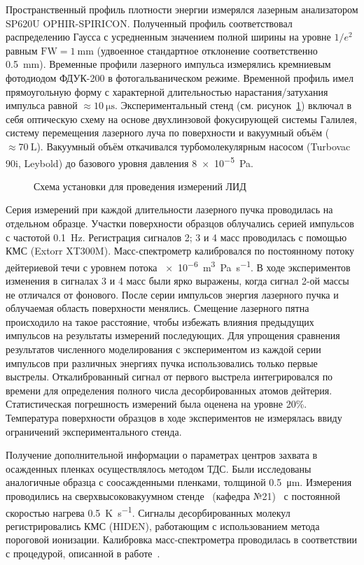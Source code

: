 Пространственный профиль плотности энергии измерялся лазерным анализатором SP620U OPHIR-SPIRICON. Полученный профиль соответствовал распределению Гаусса с усредненным значением полной ширины на уровне $1/e^2$ равным \(\mathrm{FW}=\SI{1}{\milli\metre}\) (удвоенное стандартное отклонение соответственно \SI{0.5}{\milli\meter}). Временные профили лазерного импульса измерялись кремниевым фотодиодом ФДУК-200 в фотогальваническом режиме. Временной профиль имел прямоугольную форму с характерной длительностью нарастания/затухания импульса равной \( \approx \SI{10}{\micro\second} \). Экспериментальный стенд (см. рисунок~\ref{fig:ch4/LID_scheme}) включал в себя оптическую схему на основе двухлинзовой фокусирующей системы Галилея, систему перемещения лазерного луча по поверхности и вакуумный объём ($\approx\SI{70}{\liter}$). Вакуумный объём откачивался турбомолекулярным насосом (Turbovac 90i, Leybold) до базового уровня давления \SI{8e-5}{\pascal}.

\begin{figure}[ht]
    \caption{Схема установки для проведения измерений ЛИД~\cite{Medvedev2024}}\label{fig:ch4/LID_scheme}
\end{figure}

Серия измерений при каждой длительности лазерного пучка проводилась на отдельном образце. Участки поверхности образцов облучались серией импульсов с частотой \SI{0.1}{\hertz}. Регистрация сигналов 2; 3 и 4 масс проводилась с помощью КМС (Extorr XT300M). Масс-спектрометр калибровался по постоянному потоку дейтериевой течи с уровнем потока \SI{e-6}{\metre\cubed\pascal\per\second}. В ходе экспериментов изменения в сигналах 3 и 4 масс были ярко выражены, когда сигнал 2-ой массы не отличался от фонового. После серии импульсов энергия лазерного пучка и облучаемая область поверхности менялись. Смещение лазерного пятна происходило на такое расстояние, чтобы избежать влияния предыдущих импульсов на результаты измерений последующих. Для упрощения сравнения результатов численного моделирования с экспериментом из каждой серии импульсов при различных энергиях пучка использовались только первые выстрелы. Откалиброванный сигнал от первого выстрела интегрировался по времени для определения полного числа десорбированных атомов дейтерия. Статистическая погрешность измерений была оценена на уровне 20\%. Температура поверхности образцов в ходе экспериментов не измерялась ввиду ограничений экспериментального стенда.

Получение дополнительной информации о параметрах центров захвата в осажденных пленках осуществлялось методом ТДС. Были исследованы аналогичные образца с соосажденными пленками, толщиной \SI{0.5}{\micro\metre}. Измерения проводились на сверхвысоковакуумном стенде \thesisOrganizationShort \ (кафедра №21)~\cite{Rusinov2009} с постоянной скоростью нагрева \SI{0.5}{\kelvin\per\second}. Сигналы десорбированных молекул регистрировались КМС (HIDEN), работающим с использованием метода пороговой ионизации. Калибровка масс-спектрометра проводилась в соответствии с процедурой, описанной в работе~\cite{Rusinov2009}.


